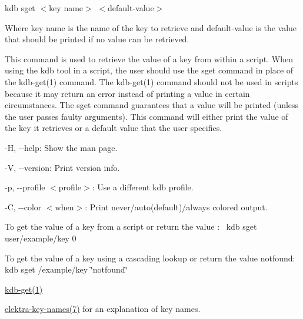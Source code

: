 {\ttfamily kdb sget $<$key name$>$ $<$default-\/value$>$}

Where {\ttfamily key name} is the name of the key to retrieve and {\ttfamily default-\/value} is the value that should be printed if no value can be retrieved.

This command is used to retrieve the value of a key from within a script. When using the kdb tool in a script, the user should use the {\ttfamily sget} command in place of the kdb-\/get(1) command. The kdb-\/get(1) command should not be used in scripts because it may return an error instead of printing a value in certain circumstances. The {\ttfamily sget} command guarantees that a value will be printed (unless the user passes faulty arguments). This command will either print the value of the key it retrieves or a default value that the user specifies.


\begin{DoxyItemize}
\item {\ttfamily -\/H}, {\ttfamily -\/-\/help}\+: Show the man page.
\item {\ttfamily -\/V}, {\ttfamily -\/-\/version}\+: Print version info.
\item {\ttfamily -\/p}, {\ttfamily -\/-\/profile $<$profile$>$}\+: Use a different kdb profile.
\item {\ttfamily -\/C}, {\ttfamily -\/-\/color $<$when$>$}\+: Print never/auto(default)/always colored output.
\end{DoxyItemize}

To get the value of a key from a script or return the value {}\+:~\newline
 {\ttfamily kdb sget user/example/key 0}

To get the value of a key using a cascading lookup or return the value {\ttfamily notfound}\+:~\newline
 {\ttfamily kdb sget /example/key \char`\"{}notfound\char`\"{}}


\begin{DoxyItemize}
\item \mbox{\hyperlink{doc_help_kdb-get_md}{kdb-\/get(1)}}
\item \mbox{\hyperlink{doc_help_elektra-key-names_md}{elektra-\/key-\/names(7)}} for an explanation of key names. 
\end{DoxyItemize}